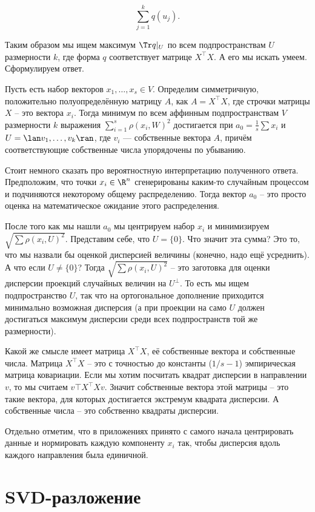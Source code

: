 $$\sum_{j=1}^k q(u_j).$$

Таким образом мы ищем максимум $\Tr q|_{U}$ по всем подпространствам $U$ размерности $k$, где форма $q$ соответствует матрице $X^{\top} X$. А его мы искать умеем. Сформулируем  ответ. 


\thrm  Пусть есть набор векторов $x_1,\dots,x_s \in V$. Определим симметричную, положительно полуопределённую матрицу $A$, как $A=X^{\top}X$, где строчки матрицы $X$ -- это вектора $x_i$. Тогда минимум по всем аффинным подпространствам $V$ размерности $k$ выражения $\sum_{i=1}^s \rho(x_i,W)^2$ достигается при $a_0=\frac{1}{s}\sum x_i$  и $U=\lan v_1,\dots,v_k\ran$, где $v_i$ --- собственные вектора $A$, причём соответствующие собственные числа упорядочены по убыванию. 
\ethrm

\rm Стоит немного сказать про вероятностную интерпретацию полученного ответа. Предположим, что точки $x_i\in \R^n$ сгенерированы каким-то случайным процессом и подчиняются некоторому общему распределению. Тогда вектор $a_0$ -- это просто оценка на математическое ожидание этого распределения.

После того как мы нашли $a_0$ мы центрируем набор $x_i$ и минимизируем $\sqrt{\sum \rho (x_i, U)^2}$. Представим себе, что $U=\{0\}$. Что значит эта сумма? Это то, что мы назвали бы оценкой дисперсией величины (конечно, надо ещё усреднить). 
А что если $U \neq \{0\}$? Тогда $\sqrt{\sum \rho (x_i, U)^2}$ -- это заготовка для оценки дисперсии проекций случайных величин на $U^\bot$. То есть мы ищем подпространство $U$, так что на ортогональное дополнение приходится минимально возможная дисперсия (а при проекции на само $U$ должен достигаться максимум дисперсии среди всех подпространств той же размерности).

Какой же смысле имеет матрица $X^\top X$, её собственные вектора и собственные числа. Матрица $X^\top X$ -- это с точностью до константы ($1/s-1$) эмпирическая матрица ковариации. Если мы хотим посчитать квадрат дисперсии в направлении $v$, то мы считаем $v\top X^\top X v$. Значит собственные вектора этой матрицы -- это такие вектора, для которых достигается экстремум квадрата дисперсии. А собственные числа -- это собственно квадраты дисперсии.
\erm

\rm Отдельно отметим, что в приложениях принято с самого начала центрировать данные и нормировать каждую компоненту $x_i$ так, чтобы дисперсия вдоль каждого направления была единичной.
\erm



\section{SVD-разложение}

